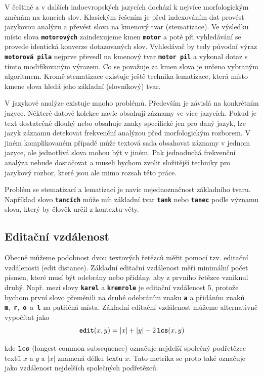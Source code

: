 \documentclass[11pt,letterpaper,oneside,openright]{book}
\newcommand{\bftt}[1]{\texttt{\textbf{#1}}}
\begin{document}
V češtině a v dalších indoevropských jazycích dochází k nejvíce morfologickým
změnám na koncích slov. Klasickým řešením je před indexováním dat provést
jazykovou analýzu a převést slova na kmenový tvar (stematizace). Ve výsledku
místo slova \bftt{motorových} zaindexujeme kmen \bftt{motor} a poté při
vyhledávání se provede identická konverze dotazovaných slov. Vyhledávač by tedy
původní výraz \bftt{motorová pila} nejprve převedl na kmenový tvar \bftt{motor
pil} a vykonal dotaz s tímto modifikovaným výrazem. Co se považuje za kmen
slova je určeno vybraným algoritmem. Kromě stematizace existuje ještě technika
lematizace, která místo kmene slova hledá jeho základní (slovníkový) tvar.

V jazykové analýze existuje mnoho problémů. Především je závislá na konkrétním
jazyce. Některé datové kolekce navíc obsahují záznamy ve více jazycích. Pokud
je text dostatečně dlouhý nebo obsahuje znaky specifické jen pro daný jazyk,
lze jazyk záznamu detekovat frekvenční analýzou před morfologickým rozborem. V
jiném komplikovaném případě může textová sada obsahovat záznamy v jednom
jazyce, ale jednotlivá slova mohou být v jiném. Pak jednoduchá frekvenční
analýza nebude dostačovat a museli bychom zvolit složitější techniky pro
jazykový rozbor, které jsou ale mimo rozsah této práce.

Problém se stematizací a lematizací je navíc nejednoznačnost základního tvaru.
Například slovo \bftt{tancích} může mít základní tvar \bftt{tank} nebo
\bftt{tanec} podle významu slova, který by člověk určil z kontextu věty.

\subsection{Editační vzdálenost}
Obecně můžeme podobnost dvou textových řetězců měřit pomocí tzv. editační
vzdálenosti (edit distance). Základní editační vzdálenost měří minimální počet
písmen, které musí být odebrány nebo přidány, aby z prvního řetězce vzniknul
druhý. Např. mezi slovy \bftt{karel} a \bftt{kremrole} je editační vzdálenost
5, protože bychom první slovo přeměnili na druhé odebráním znaku \bftt{a}
a přidáním znaků \bftt{m},~\bftt{r},~\bftt{o}~a~\bftt{l} na patřičná místa.
Základní editační vzdálenost můžeme alternativně vypočítat jako \[\bftt{edit}(x,
y) = |x| + |y| - 2\,\bftt{lcs}(x, y)\]

kde $\bftt{lcs}$ (longest common subsequence) označuje nejdelší společný
podřetězec textů $x$ a $y$ a $|x|$ znamená délku textu $x$. Tato metrika se
proto také označuje jako vzdálenost nejdelších společných podřetězců.
\end{document}
